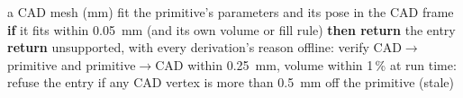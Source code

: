 \begin{algorithm}[htbp]
\caption{A CAD model as an exact primitive}
\label{alg:registry}
\begin{algorithmic}[1]
\REQUIRE a CAD mesh (mm)
  \STATE fit the primitive's parameters and its pose in the CAD frame
  \STATE \textbf{if} it fits within 0.05~mm (and its own volume or fill rule) \textbf{then return} the entry
\ENDFOR
\STATE \textbf{return} unsupported, with every derivation's reason
\STATE offline: verify CAD$\to$primitive and primitive$\to$CAD within 0.25~mm, volume within 1\,\%
\STATE at run time: refuse the entry if any CAD vertex is more than 0.5~mm off the primitive (stale)
\end{algorithmic}
\end{algorithm}

